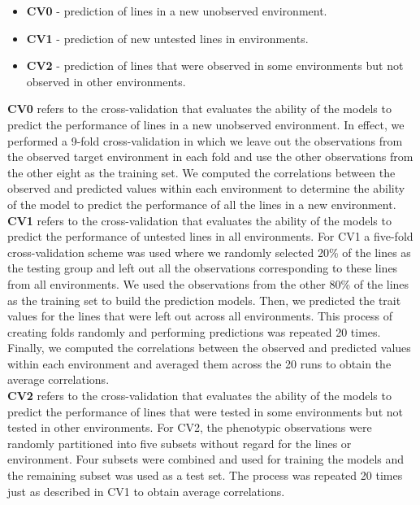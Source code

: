 \begin{itemize}
\item \textbf{CV0} - prediction of lines in a new unobserved environment.
\item \textbf{CV1} - prediction of new untested lines in environments.
\item \textbf{CV2} - prediction of lines that were observed in some environments but not observed in other environments.
\end{itemize}

\textbf{CV0} refers to the cross-validation that evaluates the ability of the models to predict the performance of lines in a new unobserved environment. In effect, we performed a 9-fold cross-validation in which we leave out the observations from the observed target environment in each fold and use the other observations from the other eight as the training set. We computed the correlations between the observed and predicted values within each environment to determine the ability of the model to predict the performance of all the lines in a new environment. \\

\textbf{CV1} refers to the cross-validation that evaluates the ability of the models to predict the performance of untested lines in all environments. For CV1 a five-fold cross-validation scheme was used where we randomly selected 20\% of the lines as the testing group and left out all the observations corresponding to these lines from all environments. We used the observations from the other 80\% of the lines as the training set to build the prediction models. Then, we predicted the trait values for the lines that were left out across all environments. This process of creating folds randomly and performing predictions was repeated 20 times. Finally, we computed the correlations between the observed and predicted values within each environment and averaged them across the 20 runs to obtain the average correlations. \\

\textbf{CV2} refers to the cross-validation that evaluates the ability of the models to predict the performance of lines that were tested in some environments but not tested in other environments. For CV2, the phenotypic observations were randomly partitioned into five subsets without regard for the lines or environment. Four subsets were combined and used for training the models and the remaining subset was used as a test set. The process was repeated 20 times just as described in CV1 to obtain average correlations.  \\



